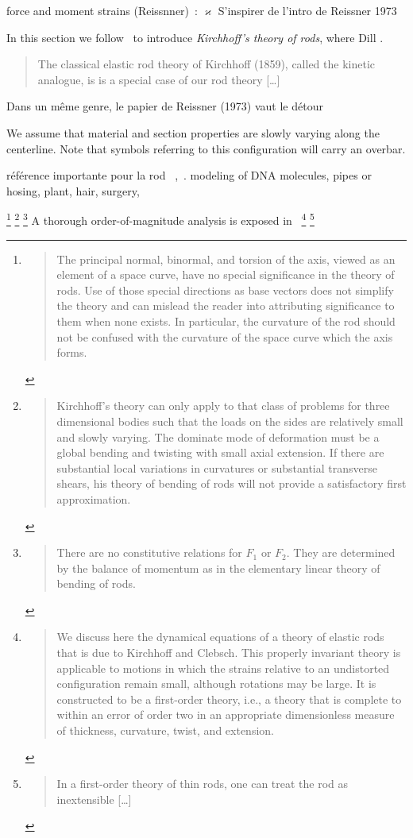 force and moment strains (Reissnner)~:  $\varkappa $ 
S'inspirer de l'intro de Reissner 1973

In this section we follow~\cite{Dill1992} to introduce \emph{Kirchhoff's theory of rods}, where Dill . \blockcquote[p.~238]{Antman2005}{The classical elastic rod theory of Kirchhoff (1859), called the kinetic analogue, is is a special case of our rod theory [\dots]}

Dans un même genre, le papier de Reissner (1973) vaut le détour~\cite{Reissner1973}

We assume that material and section properties are slowly varying along the centerline.
Note that symbols referring to this configuration will carry an overbar.

référence importante pour la rod~\cite{Moulton2013} ,~\cite[p.~109]{Villaggio1997}.
modeling of DNA molecules, pipes or hosing, plant, hair, surgery, 

\footnote{\blockcquote[p.~5]{Dill1992}{The principal normal, binormal, and torsion of the axis, viewed as an element of a space curve, have no special significance in the theory of rods. Use of those special directions as base vectors does not simplify the theory and can mislead the reader into attributing significance to them when none exists. In particular, the curvature of the rod should not be confused with the curvature of the space curve which the axis forms.}}
\footnote{\blockcquote[p.~18]{Dill1992}{Kirchhoff's theory can only apply to that class of problems for three dimensional bodies such that the loads on the sides are relatively small and slowly varying. The dominate mode of deformation must be a global bending and twisting with small axial extension. If there are substantial local variations in curvatures or substantial transverse shears, his theory of bending of rods will not provide a satisfactory first approximation.}}
\footnote{\blockcquote[p.~15]{Dill1992}{There are no constitutive relations for $F_1$ or $F_2$. They are determined by the balance of momentum as in the elementary linear theory of bending of rods.}}
A thorough order-of-magnitude analysis is exposed in~\cite{Dill1992, Coleman1993}
\footnote{\blockcquote[p.~1]{Coleman1993}{We discuss here the dynamical equations of a theory of elastic rods that is due to Kirchhoff and Clebsch. This properly invariant theory is applicable to motions in which the strains relative to an undistorted configuration remain small, although rotations may be large. It is constructed to be a first-order theory, i.e., a theory that is complete to within an error of order two in an appropriate dimensionless measure of thickness, curvature, twist, and extension.}}
\footnote{\blockcquote[p.~1]{Coleman1993}{In a first-order theory of thin rods, one can treat the rod as inextensible [\dots]}}


